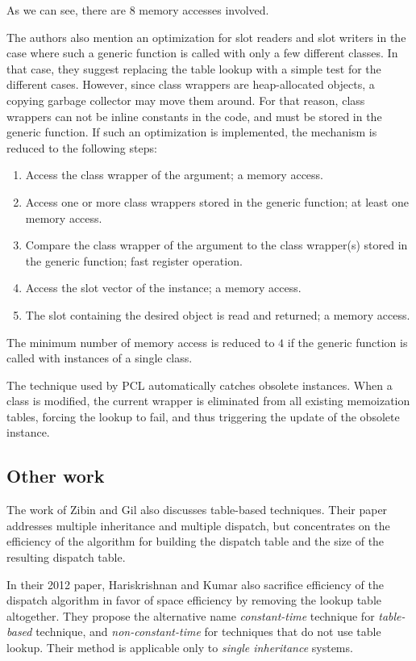 As we can see, there are $8$ memory accesses involved. 

The authors also mention an optimization for slot readers and slot
writers in the case where such a generic function is called with only
a few different classes.  In that case, they suggest replacing the
table lookup with a simple test for the different cases.  However,
since class wrappers are heap-allocated objects, a copying garbage
collector may move them around.  For that reason, class wrappers can
not be inline constants in the code, and must be stored in the generic
function.  If such an optimization is implemented, the mechanism is
reduced to the following steps:

\begin{enumerate}
\item Access the class wrapper of the argument; a memory access.
\item Access one or more class wrappers stored in the generic
  function; at least one memory access.
\item Compare the class wrapper of the argument to the class
  wrapper(s) stored in the generic function; fast register operation.
\item Access the slot vector of the instance; a memory access.
\item The slot containing the desired object is read and returned; a
  memory access.
\end{enumerate}

The minimum number of memory access is reduced to $4$ if the generic
function is called with instances of a single class.  

The technique used by PCL automatically catches obsolete instances.
When a class is modified, the current wrapper is eliminated from all
existing memoization tables, forcing the lookup to fail, and thus
triggering the update of the obsolete instance.  

\subsection{Other work}

The work of Zibin and Gil \cite{Zibin:2002:FAC:582419.582434} also
discusses table-based techniques.  Their paper addresses multiple
inheritance and multiple dispatch, but concentrates on the efficiency
of the algorithm for building the dispatch table and the size of the
resulting dispatch table. 

In their 2012 paper, Hariskrishnan and Kumar
\cite{Harikrishnan:2012:SEN:2108144.2108153} also sacrifice efficiency
of the dispatch algorithm in favor of space efficiency by removing the
lookup table altogether.  They propose the alternative name
\emph{constant-time} technique for \emph{table-based} technique, and
\emph{non-constant-time} for techniques that do not use table lookup.
Their method is applicable only to \emph{single inheritance} systems. 
